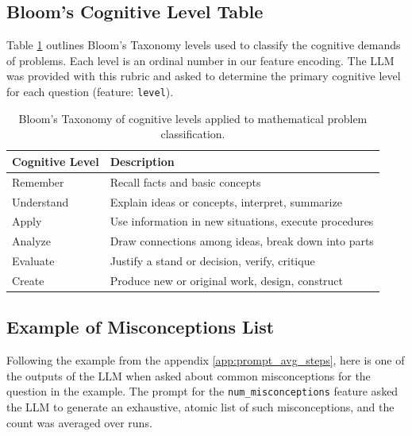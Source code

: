 \documentclass[
    a4paper, %
    10pt, %
    twoside, %
]{LTJournalArticle}
\begin{document}
\subsection{Bloom's Cognitive Level Table}
\label{app:bloom_taxonomy}
Table \ref{tab:blooms-taxonomy} outlines Bloom's Taxonomy levels used to classify the cognitive demands of problems. Each level is an ordinal number in our feature encoding. The LLM was provided with this rubric and asked to determine the primary cognitive level for each question (feature: \texttt{level}).
\begin{table}[H]
    \centering
    \begin{tabular}{p{}p{}}
        \hline
        \textbf{Cognitive Level} & \textbf{Description} \\
        \hline
        Remember & Recall facts and basic concepts \\
        Understand & Explain ideas or concepts, interpret, summarize \\
        Apply & Use information in new situations, execute procedures \\
        Analyze & Draw connections among ideas, break down into parts \\
        Evaluate & Justify a stand or decision, verify, critique \\
        Create & Produce new or original work, design, construct \\
        \hline
    \end{tabular}
    \caption{Bloom's Taxonomy of cognitive levels applied to mathematical problem classification.}
    \label{tab:blooms-taxonomy}
\end{table}

\subsection{Example of Misconceptions List}
\label{app:num_misconceptions}
Following the example from the appendix \ref{app:prompt_avg_steps}, here is one of the outputs of the LLM when asked about common misconceptions for the question in the example. The prompt for the \texttt{num\_misconceptions} feature asked the LLM to generate an exhaustive, atomic list of such misconceptions, and the count was averaged over runs.
\end{document}
